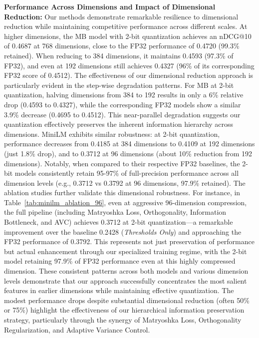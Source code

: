\textbf{Performance Across Dimensions and Impact of Dimensional Reduction:}
Our methods demonstrate remarkable resilience to dimensional reduction while maintaining competitive performance across different scales. At higher dimensions, the MB model with 2-bit quantization achieves an nDCG@10 of 0.4687 at 768 dimensions, close to the FP32 performance of 0.4720 (99.3\% retained). When reducing to 384 dimensions, it maintains 0.4593 (97.3\% of FP32), and even at 192 dimensions still achieves 0.4327 (96\% of its corresponding FP32 score of 0.4512).
The effectiveness of our dimensional reduction approach is particularly evident in the step-wise degradation patterns. For MB at 2-bit quantization, halving dimensions from 384 to 192 results in only a 6\% relative drop (0.4593 to 0.4327), while the corresponding FP32 models show a similar 3.9\% decrease (0.4695 to 0.4512). This near-parallel degradation suggests our quantization effectively preserves the inherent information hierarchy across dimensions.
MiniLM exhibits similar robustness: at 2-bit quantization, performance decreases from 0.4185 at 384 dimensions to 0.4109 at 192 dimensions (just 1.8\% drop), and to 0.3712 at 96 dimensions (about 10\% reduction from 192 dimensions). Notably, when compared to their respective FP32 baselines, the 2-bit models consistently retain 95-97\% of full-precision performance across all dimension levels (e.g., 0.3712 vs 0.3792 at 96 dimensions, 97.9\% retained).
The ablation studies further validate this dimensional robustness. For instance, in Table~\ref{tab:minilm_ablation_96}, even at aggressive 96-dimension compression, the full pipeline (including Matryoshka Loss, Orthogonality, Information Bottleneck, and AVC) achieves 0.3712 at 2-bit quantization—a remarkable improvement over the baseline 0.2428 (\textit{Thresholds Only}) and approaching the FP32 performance of 0.3792. This represents not just preservation of performance but actual enhancement through our specialized training regime, with the 2-bit model retaining 97.9\% of FP32 performance even at this highly compressed dimension.
These consistent patterns across both models and various dimension levels demonstrate that our approach successfully concentrates the most salient features in earlier dimensions while maintaining effective quantization. The modest performance drops despite substantial dimensional reduction (often 50\% or 75\%) highlight the effectiveness of our hierarchical information preservation strategy, particularly through the synergy of Matryoshka Loss, Orthogonality Regularization, and Adaptive Variance Control.


